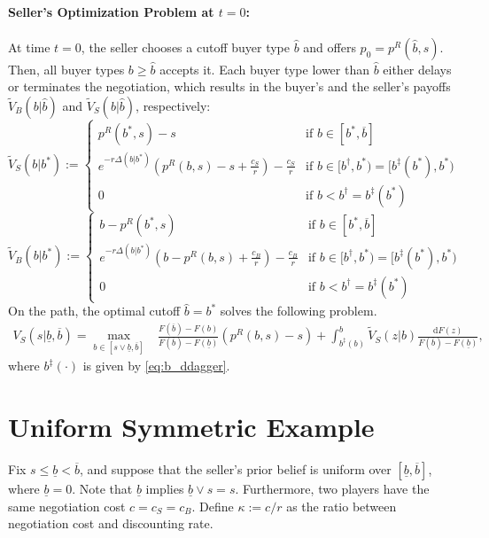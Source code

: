 \paragraph{Seller's Optimization Problem at $t=0$:}
At time $t=0$, the seller chooses a cutoff buyer type $\hat b$ and offers  $p_0=p^R(\hat b,s)$. Then, all buyer types $b\geq \hat b$ accepts it. Each buyer type lower than $\hat b$ either delays or terminates the negotiation, which results in the buyer's and the seller's payoffs $\widetilde V_B (b|\hat b)$ and $\widetilde V_S (b|\hat b)$, respectively:
	$$
	\widetilde V_S (b|b^*):=
	\left\{
	\begin{array}{ll}
    \displaystyle p^R(b^*,s)-s & \text{if $b\in[b^*,\overline b]$}
    \\[5pt]
	\displaystyle e^{-r\Delta (b|b^*)}\left(p^R(b,s)-s+\frac{c_S}{r}\right)-\frac{c_S}{r} & \text{if $b\in [b^\dagger, b^*)=[b^\ddagger(b^*), b^*)$}
	\\[5pt]
	0 & \text{if $b<b^\dagger=b^\ddagger(b^*)$} 
	\end{array}
	\right.
	$$
	$$
	\widetilde V_B (b|b^*):=\left\{
	\begin{array}{ll}
    \displaystyle b-p^R(b^*,s)& \text{if $b\in[b^*,\overline b]$}
    \\[5pt]
	\displaystyle e^{-r\Delta (b|b^*)}\left(b-p^R(b,s)+\frac{c_B}{r}\right)-\frac{c_B}{r} & \text{if $b\in [b^\dagger, b^*)=[b^\ddagger(b^*), b^*)$}
	\\[5pt]
	0 & \text{if $b<b^\dagger=b^\ddagger(b^*)$} 
	\end{array}
	\right.
	$$
On the path, the optimal cutoff $\hat b=b^*$ solves the following problem. 
	\begin{align}\label{eq:seller_optimization_problem}
	V_S (s|\underline b,\overline b
	)=\max_{b\in[s\vee \underline b,\overline b]}& \frac{F(\overline b)-F(b)}{F(\overline b)-F(\underline b)}(p^R(b,s)-s)
    +\int_{b^\ddagger(b)}^b \widetilde V_S (z|b)\frac{\text{d}F(z)}{F(\overline b)-F(\underline b)},
	\end{align}
where $b^\ddagger(\cdot)$ is given by \eqref{eq:b_ddagger}. 


\section{Uniform Symmetric Example}

Fix $s\leq \underline b < \overline b$, and suppose that the seller's prior belief is uniform over $[\underline b,\overline b]$, {\color{red} where $\underline b=0$}. Note that $\underline b$ implies $\underline b\vee s =s$. Furthermore, two players have the same negotiation cost $c=c_S=c_B$. {\color{red} Define $\kappa:=c/r$ as the ratio between negotiation cost and discounting rate.}

